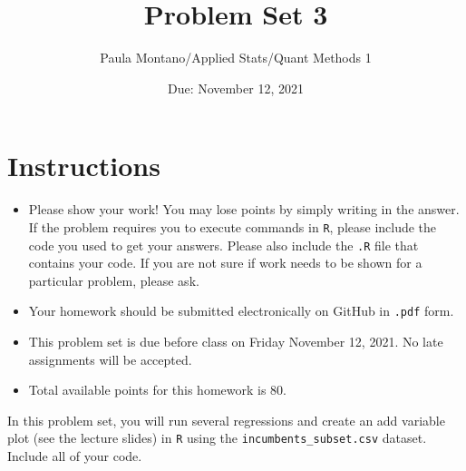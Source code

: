 \documentclass[12pt,letterpaper]{article}
\title{Problem Set 3}
\date{Due: November 12, 2021}
\author{Paula Montano/Applied Stats/Quant Methods 1}
\begin{document}
	\maketitle
	\section*{Instructions}
	\begin{itemize}
		\item Please show your work! You may lose points by simply writing in the answer. If the problem requires you to execute commands in \texttt{R}, please include the code you used to get your answers. Please also include the \texttt{.R} file that contains your code. If you are not sure if work needs to be shown for a particular problem, please ask.
		\item Your homework should be submitted electronically on GitHub in \texttt{.pdf} form.
		\item This problem set is due before class on Friday November 12, 2021. No late assignments will be accepted.
		\item Total available points for this homework is 80.
	\end{itemize}
	
	
	\vspace{.25cm}
	
	\noindent In this problem set, you will run several regressions and create an add variable plot (see the lecture slides) in \texttt{R} using the \texttt{incumbents\_subset.csv} dataset. Include all of your code.
	
	\vspace{.5cm}
\end{document}
